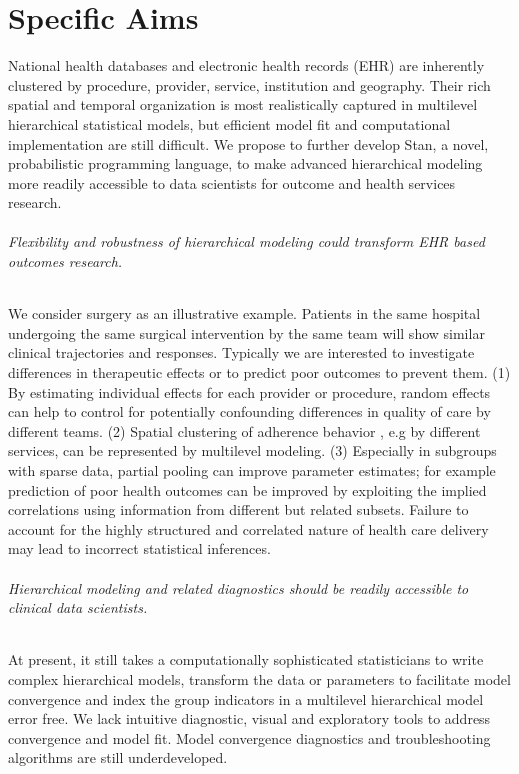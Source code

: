 \documentclass[11pt,notitlepage]{article}
\begin{document}
\part*{Specific Aims}
National health databases and electronic health records (EHR) are inherently clustered by procedure, provider, service, institution and geography. Their rich spatial and temporal organization is most realistically captured in multilevel hierarchical statistical models, but efficient model fit and computational implementation are still difficult. We propose to further develop Stan, a novel, probabilistic programming language, to make advanced hierarchical modeling more readily accessible to data scientists for outcome and health services research. 

\paragraph*{Flexibility and robustness of hierarchical modeling could transform EHR based outcomes research.} We consider surgery as an illustrative example. Patients in the same hospital undergoing the same surgical intervention by the same team will show similar clinical trajectories and responses. Typically we are interested to investigate differences in therapeutic effects or to predict poor outcomes to prevent them. (1) By estimating individual effects for each provider or procedure, random effects can help to control for potentially confounding differences in quality of care by different teams. (2) Spatial clustering of adherence behavior , e.g by different services, can be represented by multilevel modeling. (3) Especially in subgroups with sparse data, partial pooling can improve parameter estimates; for example prediction of poor health outcomes can be improved by exploiting the implied correlations using information from different but related subsets. Failure to account for the highly structured and correlated nature of health care delivery may lead to incorrect statistical inferences.

\paragraph*{Hierarchical modeling and related diagnostics should be readily accessible to clinical data scientists.} At present, it still takes a computationally sophisticated statisticians to write complex hierarchical models, transform the data or parameters to facilitate model convergence and index the group indicators in a multilevel hierarchical model error free. We lack intuitive diagnostic, visual and exploratory tools to address convergence and model fit. Model convergence diagnostics and troubleshooting algorithms are still underdeveloped. 
\end{document}

